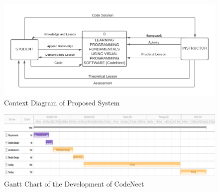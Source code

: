 \begin{doublespace}
\begin{center}
		\begin{figure}[H]
			\centering
			\includegraphics[width=\textwidth]{figures/context_diagram.png}
			\caption{Context Diagram of Proposed System}
			\label{fig:context_diagram}
		\end{figure}
		\vfill

		\newpage
		\null\vfill
		\begin{figure}[H]
			\centering
			\includegraphics[width=0.8\textheight,angle=90]{figures/gantt_chart.png}
			\caption[Gantt Chart]{Gantt Chart of the Development of CodeNect}
			\label{fig:gantt_chart}
		\end{figure}
		\vfill


\end{center}
\end{doublespace}
